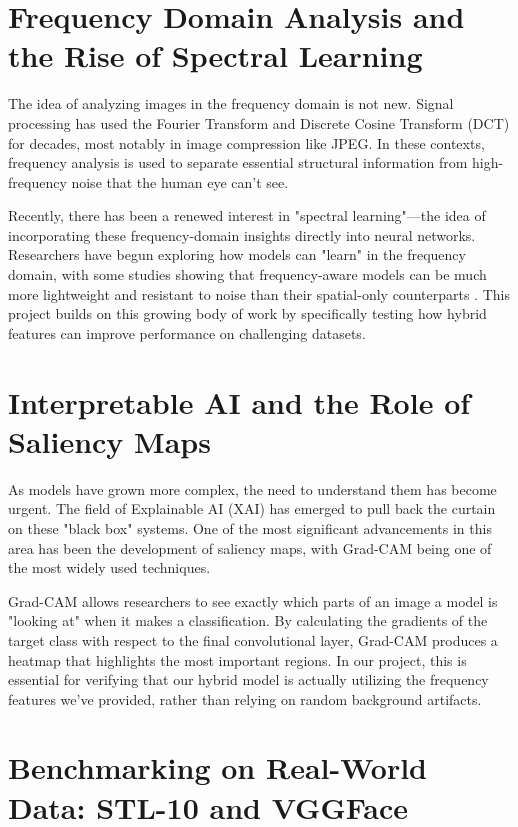 \section{Frequency Domain Analysis and the Rise of Spectral Learning}

The idea of analyzing images in the frequency domain is not new. Signal processing has used the Fourier Transform \cite{fft} and Discrete Cosine Transform (DCT) for decades, most notably in image compression like JPEG. In these contexts, frequency analysis is used to separate essential structural information from high-frequency noise that the human eye can't see.

Recently, there has been a renewed interest in "spectral learning"—the idea of incorporating these frequency-domain insights directly into neural networks. Researchers have begun exploring how models can "learn" in the frequency domain, with some studies showing that frequency-aware models can be much more lightweight and resistant to noise than their spatial-only counterparts \cite{freq_learning}. This project builds on this growing body of work by specifically testing how hybrid features can improve performance on challenging datasets.

\section{Interpretable AI and the Role of Saliency Maps}

As models have grown more complex, the need to understand them has become urgent. The field of Explainable AI (XAI) has emerged to pull back the curtain on these "black box" systems. One of the most significant advancements in this area has been the development of saliency maps, with Grad-CAM \cite{gradcam} being one of the most widely used techniques.

Grad-CAM allows researchers to see exactly which parts of an image a model is "looking at" when it makes a classification. By calculating the gradients of the target class with respect to the final convolutional layer, Grad-CAM produces a heatmap that highlights the most important regions. In our project, this is essential for verifying that our hybrid model is actually utilizing the frequency features we’ve provided, rather than relying on random background artifacts.

\section{Benchmarking on Real-World Data: STL-10 and VGGFace}

